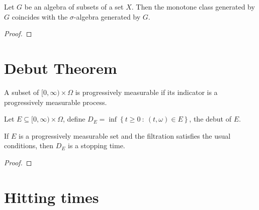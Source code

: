 \begin{theorem}\label{thm:monotone_class}
  \leanok
Let \(G\) be an algebra of subsets of a set \(X\). Then the monotone class generated by \(G\) coincides with the $\sigma$-algebra generated by \(G\).
\end{theorem}

\begin{proof}\leanok

\end{proof}




\section{Debut Theorem}


\begin{definition}\label{def:progr_meas_set}
  \leanok
A subset of $[0, \infty) \times \Omega$ is progressively measurable if its indicator is a progressively measurable process.
\end{definition}


\begin{definition}\label{def:debut_set}
  \leanok
Let $E \subseteq{} [0, \infty) \times \Omega $, define $D_E = \inf\left\lbrace t \geq 0\ :\ (t, \omega) \in E\right\rbrace$, the debut of $E$.
\end{definition}


\begin{theorem}\label{thm:debut_of_progr_meas_is_stop_time}
  \leanok
If $E$ is a progressively measurable set and the filtration satisfies the usual conditions, then $D_E$ is a stopping time.
\end{theorem}

\begin{proof}\leanok

\end{proof}




\section{Hitting times}

